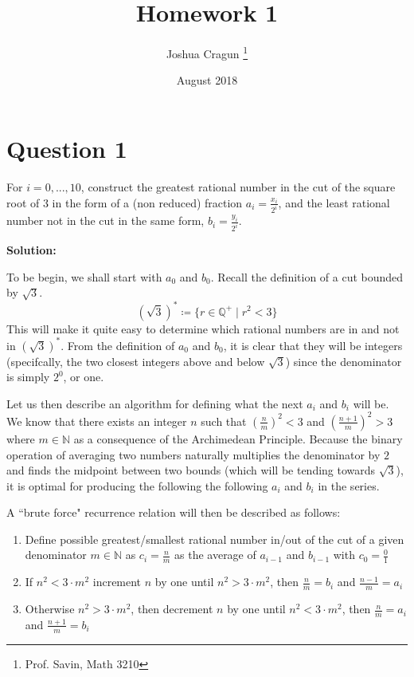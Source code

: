 \documentclass[12pt, letterpaper]{article}
\title{Homework 1}
\author{Joshua Cragun \thanks{Prof. Savin, Math 3210}}
\date{August 2018}
\begin{document}
\begin{titlepage}
\maketitle
\end{titlepage}

\section*{Question 1}
For $i = 0, ..., 10$, construct the greatest rational number in the cut of the
square root of $3$ in the form of a (non reduced) fraction $a_i = \frac{x_i}{2^i}$,
and the least rational number not in the cut in the same form, $b_i = \frac{y_i}{2^i}$.

\noindent\textbf{Solution:}

To be begin, we shall start with $a_0$ and $b_0$. Recall the definition of a cut bounded by $\sqrt{3}$.
$$ (\sqrt{3})^{*} \coloneqq \{r \in \mathbb{Q}^+ \mid r^2 < 3 \} $$
This will make it quite easy to determine which rational numbers are in and not
in $(\sqrt{3})^{*}$. From the definition of $a_0$ and $b_0$, it is clear that they will
be integers (specifcally, the two closest integers above and below $\sqrt{3}$) since the denominator is simply $2^0$, or one.

Let us then describe an algorithm for defining what the next $a_i$ and $b_i$ will be.
We know that there exists an integer $n$ such that $(\frac{n}{m})^2 < 3$ and $(\frac{n + 1}{m})^2 > 3$ where $m \in \mathbb{N}$ as a consequence of the Archimedean Principle.
Because the binary operation of averaging two numbers naturally multiplies the denominator by $2$ and finds the midpoint between
two bounds (which will be tending towards $\sqrt{3}$), it is optimal for producing the following the following $a_i$ and $b_i$ in the series.

A ``brute force" recurrence relation will then be described as follows:

\begin{enumerate}
  \item Define possible greatest/smallest rational number in/out of the cut of a given denominator $m \in \mathbb{N}$ as $c_i = \frac{n}{m}$ as the average of $a_{i-1}$ and $b_{i-1}$ with $c_0 = \frac{0}{1}$
  \item If $n^2 < 3 \cdot m^2$ increment $n$ by one until $n^2 > 3 \cdot m^2$, then $\frac{n}{m} = b_i$ and $\frac{n - 1}{m} = a_i$
  \item Otherwise $n^2 > 3 \cdot m^2$, then decrement $n$ by one until $n^2 < 3 \cdot m^2$, then $\frac{n}{m} = a_i$ and $\frac{n + 1}{m} = b_i$
\end{enumerate}
\end{document}
